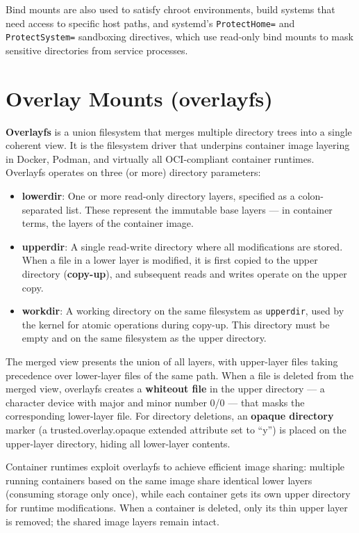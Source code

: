 Bind mounts are also used to satisfy chroot environments, build systems that need access to specific host paths, and systemd's \texttt{ProtectHome=} and \texttt{ProtectSystem=} sandboxing directives, which use read-only bind mounts to mask sensitive directories from service processes.

\section{Overlay Mounts (overlayfs)}

\textbf{Overlayfs} is a union filesystem that merges multiple directory trees into a single coherent view. It is the filesystem driver that underpins container image layering in Docker, Podman, and virtually all OCI-compliant container runtimes. Overlayfs operates on three (or more) directory parameters:

\begin{itemize}
  \item \textbf{lowerdir}: One or more read-only directory layers, specified as a colon-separated list. These represent the immutable base layers --- in container terms, the layers of the container image.
  \item \textbf{upperdir}: A single read-write directory where all modifications are stored. When a file in a lower layer is modified, it is first copied to the upper directory (\textbf{copy-up}), and subsequent reads and writes operate on the upper copy.
  \item \textbf{workdir}: A working directory on the same filesystem as \texttt{upperdir}, used by the kernel for atomic operations during copy-up. This directory must be empty and on the same filesystem as the upper directory.
\end{itemize}

The merged view presents the union of all layers, with upper-layer files taking precedence over lower-layer files of the same path. When a file is deleted from the merged view, overlayfs creates a \textbf{whiteout file} in the upper directory --- a character device with major and minor number 0/0 --- that masks the corresponding lower-layer file. For directory deletions, an \textbf{opaque directory} marker (a trusted.overlay.opaque extended attribute set to ``y'') is placed on the upper-layer directory, hiding all lower-layer contents.

Container runtimes exploit overlayfs to achieve efficient image sharing: multiple running containers based on the same image share identical lower layers (consuming storage only once), while each container gets its own upper directory for runtime modifications. When a container is deleted, only its thin upper layer is removed; the shared image layers remain intact.

